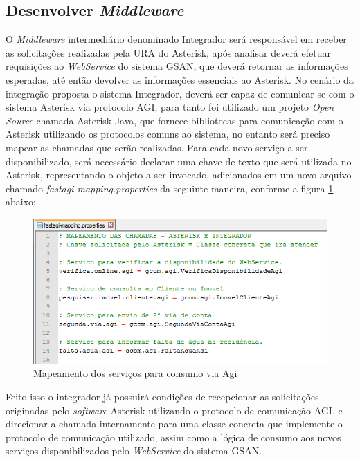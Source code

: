 \subsection{Desenvolver \textit{Middleware}}

O \textit{Middleware} intermediário denominado Integrador será responsável em receber as solicitações realizadas pela URA do Asterisk, após analisar deverá efetuar requisições ao \textit{WebService} do sistema GSAN, que deverá retornar as informações esperadas, até então devolver as informações essenciais ao Asterisk.
No cenário da integração proposta o sistema Integrador, deverá ser capaz de comunicar-se com o sistema Asterisk via protocolo AGI, para tanto foi utilizado um projeto \textit{Open Source} chamada Asterisk-Java, que fornece bibliotecas para comunicação com o Asterisk utilizando os protocolos comuns ao sistema, no entanto será preciso mapear as chamadas que serão realizadas.
Para cada novo serviço a ser disponibilizado, será necessário declarar uma chave de texto que será utilizada no Asterisk, representando o objeto a ser invocado, adicionados em um novo arquivo chamado \textit{fastagi-mapping.properties} da seguinte maneira, conforme a figura \ref{figura:mapeamenteServicosAGI} abaixo:

\begin{figure}[!htb]
	\centering
	\caption{Mapeamento dos serviços para consumo via Agi}
	\label{figura:mapeamenteServicosAGI}
	\includegraphics{figuras/mapeamento_servicos_agi.png}
\end{figure}


Feito isso o integrador já possuirá condições de recepcionar as solicitações originadas pelo \textit{software} Asterisk utilizando o protocolo de comunicação AGI, e direcionar a chamada internamente para uma classe concreta que implemente o protocolo de comunicação utilizado, assim como a lógica de consumo aos novos serviços disponibilizados pelo \textit{WebService} do sistema GSAN.

